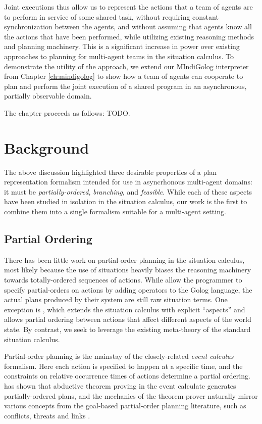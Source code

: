 Joint executions thus allow us to represent the actions that a team
of agents are to perform in service of some shared task, without requiring
constant synchronization between the agents, and without assuming
that agents know all the actions that have been performed, while utilizing
existing reasoning methods and planning machinery. This is a significant
increase in power over existing approaches to planning for multi-agent
teams in the situation calculus. To demonstrate the utility of the
approach, we extend our MIndiGolog interpreter from Chapter \ref{ch:mindigolog}
to show how a team of agents can cooperate to plan and perform the
joint execution of a shared program in an asynchronous, partially
observable domain.

The chapter proceeds as follows: TODO.


\section{Background\label{sec:JointExec:Background}}

The above discussion highlighted three desirable properties of a plan
representation formalism intended for use in asyncrhonous multi-agent
domains: it must be \emph{partially-ordered}, \emph{branching}, and
\emph{feasible}. While each of these aspects have been studied in
isolation in the situation calculus, our work is the first to combine
them into a single formalism suitable for a multi-agent setting.


\subsection{Partial Ordering}

There has been little work on partial-order planning in the situation
calculus, most likely because the use of situations heavily biases
the reasoning machinery towards totally-ordered sequences of actions.
While \citet{son00htn_golog} allow the programmer to specify partial-orders
on actions by adding operators to the Golog language, the actual plans
produced by their system are still raw situation terms. One exception
is \citep{plaisted97sc_aspect}, which extends the situation calculus
with explicit {}``aspects'' and allows partial ordering between
actions that affect different aspects of the world state. By contrast,
we seek to leverage the existing meta-theory of the standard situation
calculus.

Partial-order planning is the mainstay of the closely-related \emph{event
calculus} formalism. Here each action is specified to happen at a
specific time, and the constraints on relative occurrence times of
actions determine a partial ordering. \citet{Shanahan97ec_planning}
has shown that abductive theorem proving in the event calculate generates
partially-ordered plans, and the mechanics of the theorem prover naturally
mirror various concepts from the goal-based partial-order planning
literature, such as conflicts, threats and links \citep{peot92conditional_nonlinear}.


